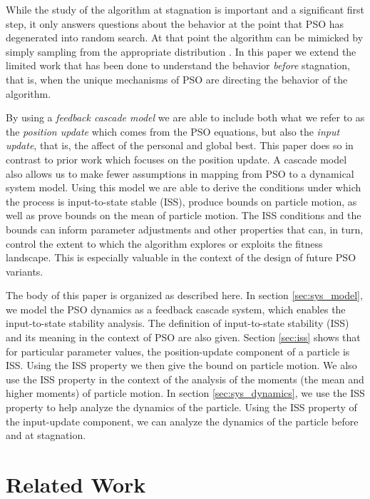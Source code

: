 \documentclass{sig-alternate}
\begin{document}
While the study of the algorithm at stagnation is important and a significant first step, it only answers questions about the behavior at the point that PSO has degenerated into random search.
At that point the algorithm can be mimicked by simply sampling from the appropriate distribution \cite{5175367}.
In this paper we extend the limited work that has been done to understand
the behavior \emph{before} stagnation, that is, when the unique mechanisms of PSO are directing the behavior of the algorithm.

By using a \emph{feedback cascade model} we are able to include both what we refer to as the \emph{position update} which comes from the PSO equations, but also the \emph{input update}, that is, the affect of the personal and global best.
This paper does so in contrast to prior work which focuses on the position update.
A cascade model also allows us to make fewer assumptions in mapping from PSO to a dynamical system model.
Using this model we are able to derive the conditions under which the process is input-to-state stable (ISS)\cite{Jiang2001857}, produce bounds on particle motion, as well as prove bounds on the mean of particle motion.
The ISS conditions and the bounds can inform parameter adjustments and other properties that can, in turn, control the extent to which the algorithm explores or exploits the fitness landscape.
This is especially valuable in the context of the design of future PSO variants. 

The body of this paper is organized as described here.
In section \ref{sec:sys_model}, we model the PSO dynamics as a feedback cascade system, which enables the input-to-state stability analysis.
The definition of input-to-state stability (ISS) and its meaning in the context of PSO are also given.
Section \ref{sec:iss} shows that for particular parameter values, the position-update component of a particle is ISS. 
Using the ISS property we then give the bound on particle motion.
We also use the ISS property in the context of the analysis of the moments (the mean and higher moments) of particle motion.
In section \ref{sec:sys_dynamics}, we use the ISS property to help analyze the dynamics of the particle.
Using the ISS property of the input-update component, we can analyze the dynamics of the particle before and at stagnation.

\section{Related Work}
\label{sec:relwork}
\end{document}
